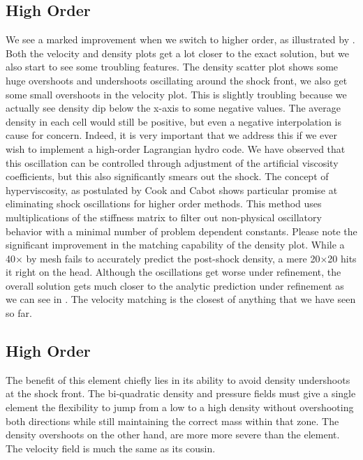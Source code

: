 
\subsection{High Order \texorpdfstring{}{Q2-Q1}}
We see a marked improvement when we switch to higher order, as illustrated by . Both the velocity and density plots get a lot closer to the exact solution, but we also start to see some troubling features. The density scatter plot shows some huge overshoots and undershoots oscillating around the shock front, we also get some small overshoots in the velocity plot. This is slightly troubling because we actually see density dip below the x-axis to some negative values. The average density in each cell would still be positive, but even a negative interpolation is cause for concern. Indeed, it is very important that we address this if we ever wish to implement a high-order Lagrangian hydro code. We have observed that this oscillation can be controlled through adjustment of the artificial viscosity coefficients, but this also significantly smears out the shock. The concept of hyperviscosity, as postulated by Cook and Cabot \cite{CookCabot2004,CookCabot2005} shows particular promise at eliminating shock oscillations for higher order methods. This method uses multiplications of the stiffness matrix to filter out non-physical oscillatory behavior with a minimal number of problem dependent constants. Please note the significant improvement in the matching capability of the density plot. While a 40$\times$ by  mesh fails to accurately predict the post-shock density, a mere 20$\times$20  hits it right on the head. Although the oscillations get worse under refinement, the overall solution gets much closer to the analytic prediction under refinement as we can see in . The velocity matching is the closest of anything that we have seen so far. 


\subsection{High Order \texorpdfstring{}{Q2-Q2}}\label{sec:nohQ2Q2}
The benefit of this element chiefly lies in its ability to avoid density undershoots at the shock front. The bi-quadratic density and pressure fields must give a single element the flexibility to jump from a low to a high density  without overshooting both directions while still maintaining the correct mass within that zone. The density overshoots on the other hand, are more more severe than the  element. The velocity field is much the same as its  cousin.

